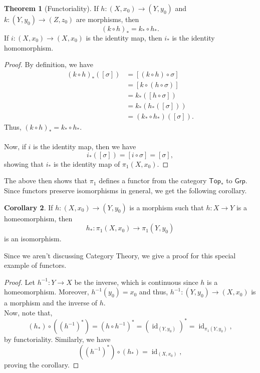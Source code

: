 \documentclass[12pt]{article}
\theoremstyle{definition}
\newtheorem{thm}{Theorem}
\numberwithin{thm}{section}
\newtheorem{cor}[thm]{Corollary}
\newcommand{\id}{\operatorname{id}}
\begin{document}
\begin{thm}[Functoriality]
	If $h:(X, x_0) \to (Y, y_0)$ and $k:(Y, y_0) \to (Z, z_0)$ are morphisms, then
	\begin{equation*} 
		(k \circ h)_* = k_* \circ h_*.
	\end{equation*}
	If $i:(X, x_0) \to (X, x_0)$ is the identity map, then $i_*$ is the identity homomorphism.
\end{thm}
\begin{proof} 
	By definition, we have
	\begin{align*} 
		(k \circ h)_*([\sigma]) &= [(k \circ h) \circ \sigma]\\
		&= [k \circ (h \circ \sigma)]\\
		&= k_*([h\circ \sigma])\\
		&= k_*(h_*([\sigma]))\\
		&= (k_* \circ h_*)([\sigma]).
	\end{align*}
	Thus, $(k \circ h)_* = k_* \circ h_*.$\\~\\
	Now, if $i$ is the identity map, then we have
	\begin{equation*} 
		i_*([\sigma]) = [i \circ \sigma] = [\sigma],
	\end{equation*}
	showing that $i_*$ is the identity map of $\pi_1(X, x_0).$
\end{proof}
The above then shows that $\pi_1$ defines a functor from the category $\mathsf{Top}_*$ to $\mathsf{Grp}.$\\
Since functors preserve isomorphisms in general, we get the following corollary.
\begin{cor}
	If $h:(X, x_0) \to (Y, y_0)$ is a morphism such that $h:X \to Y$ is a homeomorphism, then
	\begin{equation*} 
		h_* : \pi_1(X, x_0) \to \pi_1(Y, y_0)
	\end{equation*}
	is an isomorphism.
\end{cor}
Since we aren't discussing Category Theory, we give a proof for this special example of functors.
\begin{proof} 
	Let $h^{-1}:Y \to X$ be the inverse, which is continuous since $h$ is a homeomorphism. Moreover, $h^{-1}(y_0) = x_0$ and thus, $h^{-1}:(Y, y_0) \to (X, x_0)$ is a morphism and the inverse of $h.$\\
	Now, note that,
	\begin{equation*} 
		(h_*)\circ((h^{-1})^*) = (h\circ h^{-1})^* = (\id_{(Y, y_0)})^* = \id_{\pi_1(Y, y_0)},
	\end{equation*}
	by functoriality. Similarly, we have
	\begin{equation*} 
		((h^{-1})^*)\circ(h_*) = \id_{(X, x_0)},
	\end{equation*}
	proving the corollary.
\end{proof}
%
%
\end{document}
